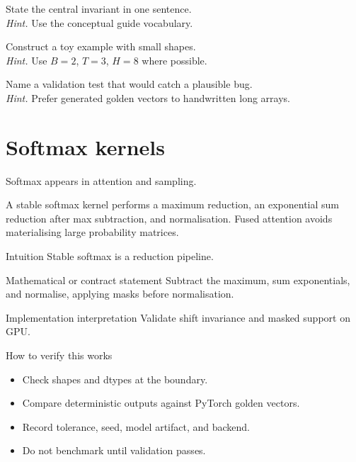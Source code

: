 \begin{chapterexercises}
\item State the central invariant in one sentence.\\
\textit{Hint.} Use the conceptual guide vocabulary.
\item Construct a toy example with small shapes.\\
\textit{Hint.} Use $B=2$, $T=3$, $H=8$ where possible.
\item Name a validation test that would catch a plausible bug.\\
\textit{Hint.} Prefer generated golden vectors to handwritten long arrays.
\end{chapterexercises}

\chapter{Softmax kernels}
\label{ch:softmax-kernels}
Softmax appears in attention and sampling.

A stable softmax kernel performs a maximum reduction, an exponential sum reduction after max subtraction, and normalisation. Fused attention avoids materialising large probability matrices. \citep{dao2022flashattention,dao2024flashattention2}

\begin{intuitionbox}{Intuition}
Stable softmax is a reduction pipeline.
\end{intuitionbox}

\begin{definitionbox}{Mathematical or contract statement}
Subtract the maximum, sum exponentials, and normalise, applying masks before normalisation.
\end{definitionbox}

\begin{implementationbox}{Implementation interpretation}
Validate shift invariance and masked support on GPU.
\end{implementationbox}

\begin{verificationbox}{How to verify this works}
\begin{itemize}
\item Check shapes and dtypes at the boundary.
\item Compare deterministic outputs against PyTorch golden vectors.
\item Record tolerance, seed, model artifact, and backend.
\item Do not benchmark until validation passes.
\end{itemize}
\end{verificationbox}

